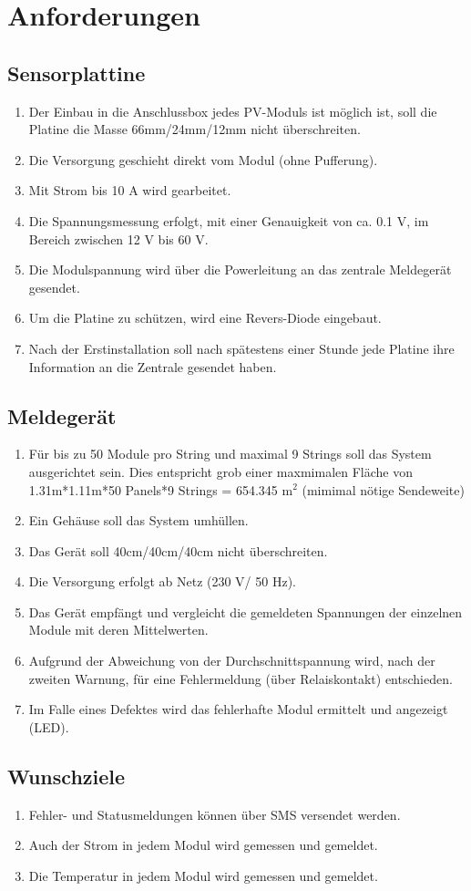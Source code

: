 %
%
%
\section{Anforderungen}

\subsection{Sensorplattine}
\begin{enumerate}
\item Der Einbau in die Anschlussbox jedes PV-Moduls ist möglich ist, soll die Platine die Masse 66mm/24mm/12mm nicht überschreiten.
\item Die Versorgung geschieht direkt vom Modul (ohne Pufferung).
\item Mit Strom bis 10 A wird gearbeitet.
\item	Die Spannungsmessung erfolgt, mit einer Genauigkeit von ca. 0.1 V, im Bereich zwischen 12 V bis 60 V.
\item	Die Modulspannung wird über die Powerleitung an das zentrale Meldegerät gesendet.
\item Um die Platine zu schützen, wird eine Revers-Diode eingebaut.
\item Nach der Erstinstallation soll nach spätestens einer Stunde jede Platine ihre Information an die Zentrale gesendet haben.
\end{enumerate}

\subsection{Meldegerät}
\begin{enumerate}
\item	Für bis zu 50 Module pro String und maximal 9 Strings soll das System ausgerichtet sein. Dies entspricht grob einer maxmimalen Fläche von 1.31m*1.11m*50 Panels*9 Strings = 654.345 m$^{2}$ (mimimal nötige Sendeweite)
\item	Ein Gehäuse soll das  System umhüllen.
\item Das Gerät soll 40cm/40cm/40cm nicht überschreiten.
\item	Die Versorgung erfolgt ab Netz (230 V/ 50 Hz).
\item	Das Gerät empfängt und vergleicht die gemeldeten Spannungen der einzelnen Module mit deren Mittelwerten.
\item	Aufgrund der Abweichung von der Durchschnittspannung wird, nach der zweiten Warnung, für eine Fehlermeldung (über Relaiskontakt) entschieden.
\item	Im Falle eines Defektes wird das fehlerhafte Modul ermittelt und angezeigt (LED).

\end{enumerate}

\subsection{Wunschziele}
\begin{enumerate}
\item	Fehler- und Statusmeldungen können über SMS versendet werden.
\item	Auch der Strom in jedem Modul wird gemessen und gemeldet.
\item	Die Temperatur in jedem Modul wird gemessen und gemeldet.
\end{enumerate}
%